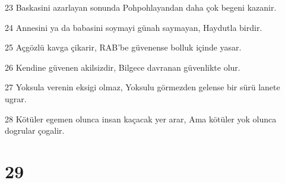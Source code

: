 \par 23 Baskasini azarlayan sonunda Pohpohlayandan daha çok begeni kazanir.
\par 24 Annesini ya da babasini soymayi günah saymayan, Haydutla birdir.
\par 25 Açgözlü kavga çikarir, RAB'be güvenense bolluk içinde yasar.
\par 26 Kendine güvenen akilsizdir, Bilgece davranan güvenlikte olur.
\par 27 Yoksula verenin eksigi olmaz, Yoksulu görmezden gelense bir sürü lanete ugrar.
\par 28 Kötüler egemen olunca insan kaçacak yer arar, Ama kötüler yok olunca dogrular çogalir.

\chapter{29}

